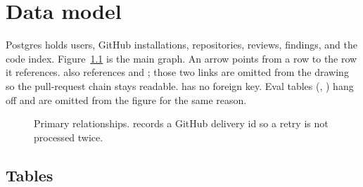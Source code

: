 \chapter{Data model}
\label{chap:data}

Postgres holds users, GitHub installations, repositories, reviews, findings, and the code index. Figure~\ref{fig:er} is the main graph. An arrow points from a row to the row it references.  also references  and ; those two links are omitted from the drawing so the pull-request chain stays readable.  has no foreign key. Eval tables (, ) hang off  and are omitted from the figure for the same reason.

\begin{figure}[H]
  \centering
  \resizebox{\linewidth}{!}{}
  \caption{Primary relationships.  records a GitHub delivery id so a retry is not processed twice.}
  \label{fig:er}
\end{figure}

\section{Tables}

